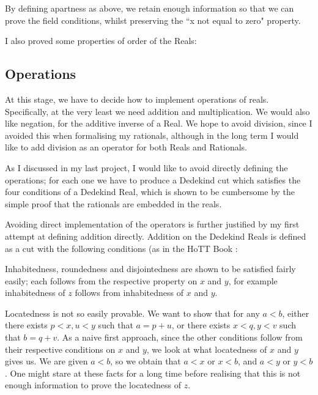 \documentclass[ProjectReport]{subfiles}
\begin{document}
By defining apartness as above, we retain enough information so that we can prove the field conditions, whilst preserving the ``x not equal to zero" property.

I also proved some properties of order of the Reals:



\subsection{Operations}

At this stage, we have to decide how to implement operations of reals. Specifically, at the very least we need addition and multiplication. We would also like negation, for the additive inverse of a Real. We hope to avoid division, since I avoided this when formalising my rationals, although in the long term I would like to add division as an operator for both Reals and Rationals.


As I discussed in my last project, I would like to avoid directly defining the operations; for each one we have to produce a Dedekind cut which satisfies the four conditions of a Dedekind Real, which is shown to be cumbersome by the simple proof that the rationals are embedded in the reals. 

Avoiding direct implementation of the operators is further justified by my first attempt at defining addition directly. Addition on the Dedekind Reals is defined as a cut with the following conditions (as in the HoTT Book \cite{hottbook}:


Inhabitedness, roundedness and disjointedness are shown to be satisfied fairly easily; each follows from the respective property on $x$ and $y$, for example inhabitedness of $z$ follows from inhabitedness of $x$ and $y$.


Locatedness is not so easily provable. We want to show that for any $a < b$, either there exists $p < x, u < y$ such that $a = p + u$, or there exists $x < q, y < v$ such that $b = q + v$. As a naive first approach, since the other conditions follow from their respective conditions on $x$ and $y$, we look at what locatedness of $x$ and $y$ gives us. We are given $a < b$, so we obtain that $a < x$ or $x < b$, and $a < y$ or $y < b$. One might stare at these facts for a long time before realising that this is not enough information to prove the locatedness of $z$. 
\end{document}
